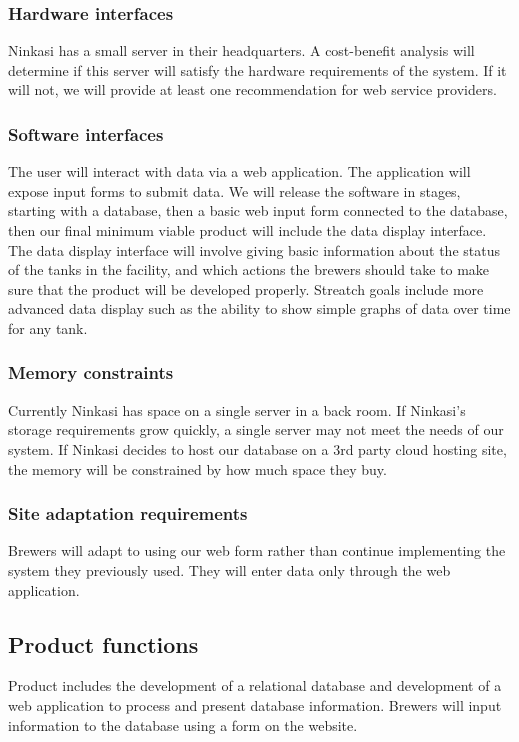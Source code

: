 \documentclass[draftclsnofoot,onecolumn,letterpaper,10pt,compsoc]{IEEEtran}
\begin{document}
		\subsubsection{Hardware interfaces}
			Ninkasi has a small server in their headquarters.
			A cost-benefit analysis will determine if this server will satisfy the hardware requirements of the system.
			If it will not, we will provide at least one recommendation for web service providers.

		\subsubsection{Software interfaces}
			The user will interact with data via a web application.
			The application will expose input forms to submit data.
			We will release the software in stages, starting with a database, then a basic web input form connected to the database, then our final minimum viable product will include the data display interface.
			The data display interface will involve giving basic information about the status of the tanks in the facility, and which actions the brewers should take to make sure that the product will be developed properly.
			Streatch goals include more advanced data display such as the ability to show simple graphs of data over time for any tank.

		\subsubsection{Memory constraints}
			Currently Ninkasi has space on a single server in a back room.
			If Ninkasi's storage requirements grow quickly, a single server may not meet the needs of our system.
			If Ninkasi decides to host our database on a 3rd party cloud hosting site, the memory will be constrained by how much space they buy.

		\subsubsection{Site adaptation requirements}
			Brewers will adapt to using our web form rather than continue implementing the system they previously used.
			They will enter data only through the web application.

	\subsection{Product functions}
		Product includes the development of a relational database and development of a web application to process and present database information.
		Brewers will input information to the database using a form on the website.
\end{document}
